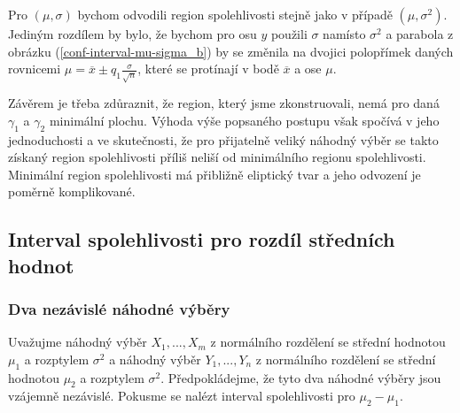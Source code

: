 Pro $(\mu, \sigma)$ bychom odvodili region spolehlivosti stejně jako v případě $(\mu, \sigma^2)$. Jediným rozdílem by bylo, že bychom pro osu $y$ použili $\sigma$ namísto $\sigma^2$ a parabola z obrázku (\ref{conf-interval-mu-sigma_b}) by se změnila na dvojici polopřímek daných rovnicemi $\mu = \overline{x} \pm q_1 \frac{\sigma}{\sqrt{n}}$, které se protínají v bodě $\overline{x}$ a ose $\mu$.

Závěrem je třeba zdůraznit, že region, který jsme zkonstruovali, nemá pro daná $\gamma_1$ a $\gamma_2$ minimální plochu. Výhoda výše popsaného postupu však spočívá v jeho jednoduchosti a ve skutečnosti, že pro přijatelně veliký náhodný výběr se takto získaný region spolehlivosti příliš neliší od minimálního regionu spolehlivosti. Minimální region spolehlivosti má přibližně eliptický tvar a jeho odvození je poměrně komplikované.

\subsection{Interval spolehlivosti pro rozdíl středních hodnot}

\subsubsection{Dva nezávislé náhodné výběry}

Uvažujme náhodný výběr $X_1, ..., X_m$ z normálního rozdělení se střední hodnotou $\mu_1$ a rozptylem $\sigma^2$ a náhodný výběr $Y_1, ..., Y_n$ z normálního rozdělení se střední hodnotou $\mu_2$ a rozptylem $\sigma^2$. Předpokládejme, že tyto dva náhodné výběry jsou vzájemně nezávislé. Pokusme se nalézt interval spolehlivosti pro $\mu_2 - \mu_1$.

